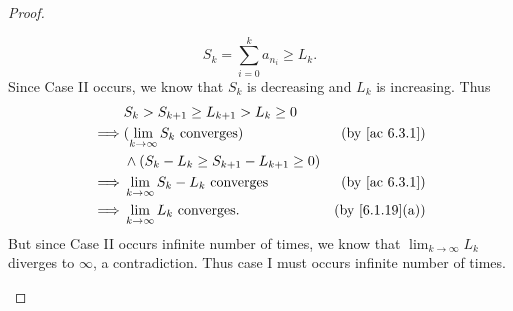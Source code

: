 \begin{proof}
\begin{itemize}
\[            S_k = \sum_{i = 0}^k a_{n_i} \geq L_k.
          \]
          Since Case II occurs, we know that \(S_k\) is decreasing and \(L_k\) is increasing.
          Thus
          \begin{align*}
                     & S_k > S_{k + 1} \geq L_{k + 1} > L_k \geq 0                                        \\
            \implies & (\lim_{k \to \infty} S_k \text{ converges})         & \text{(by \cref{ac 6.3.1})}  \\
                     & \land (S_k - L_k \geq S_{k + 1} - L_{k + 1} \geq 0)                                \\
            \implies & \lim_{k \to \infty} S_k - L_k \text{ converges}     & \text{(by \cref{ac 6.3.1})}  \\
            \implies & \lim_{k \to \infty} L_k \text{ converges}.          & \text{(by \cref{6.1.19}(a))}
          \end{align*}
          But since Case II occurs infinite number of times, we know that \(\lim_{k \to \infty} L_k\) diverges to \(\infty\), a contradiction.
          Thus case I must occurs infinite number of times.


\end{itemize}
\end{proof}
